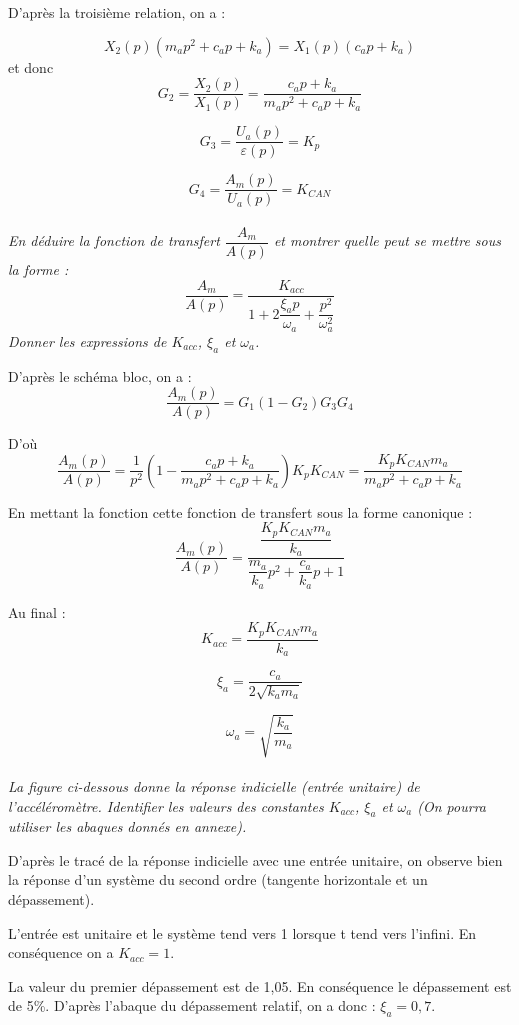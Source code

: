 \documentclass[10pt,oneside]{article}
\begin{document}
D'après la troisième relation, on a :

$$
X_2(p)\left( m_a p^2 +c_a p + k_a \right) = X_1(p) \left( c_a p + k_a  \right)
$$
 et donc 
$$
G_2 = \dfrac{X_2(p)}{X_1(p)} = \dfrac{c_a p + k_a}{m_a p^2 +c_a p + k_a}
$$

$$
G_3 = \dfrac{U_a(p)}{\varepsilon(p)} = K_p
$$

$$
G_4 = \dfrac{A_m(p)}{U_a(p)} = K_{CAN}
$$

\paragraph{}
\textit{En déduire la fonction de transfert $\dfrac{A_m}{A(p)}$ et montrer
quelle peut se mettre sous la forme :}
$$
\dfrac{A_m}{A(p)} = \dfrac{K_{acc}}{1+2\dfrac{\xi_a p}{\omega_a} +
\dfrac{p^2}{\omega_a^2}} 
$$
\textit{Donner les expressions de $K_{acc}$, $\xi_a$ et $\omega_a$.}

D'après le schéma bloc, on a : 
$$
 \dfrac{A_m(p)}{A(p)} = G_1 \left(1 - G_2 \right) G_3 G_4 
$$

D'où 
$$
 \dfrac{A_m(p)}{A(p)} = \dfrac{1}{p^2} \left( 1- \dfrac{c_a p + k_a}{m_a p^2
+c_a p + k_a} \right)  K_p K_{CAN} =
\dfrac{K_p K_{CAN} m_a}{m_a p^2 +c_a p + k_a}
$$

En mettant la fonction cette fonction de transfert sous la forme canonique :
$$
\dfrac{A_m(p)}{A(p)} = \dfrac{\dfrac{K_p K_{CAN} m_a}{k_a}}{\dfrac{m_a}{k_a}p^2
+ \dfrac{c_a}{k_a}p+1}
$$

Au final : 
$$
K_{acc} = \dfrac{K_p K_{CAN} m_a}{k_a}
$$

$$
\xi_a = \dfrac{c_a}{2\sqrt{k_a m_a}}
$$

$$
\omega_a = \sqrt{\dfrac{k_a}{m_a}}
$$
\paragraph{}
\textit{La figure ci-dessous donne la réponse indicielle (entrée unitaire) de
l'accéléromètre. 
Identifier les valeurs des constantes $K_{acc}$, $\xi_a$ et $\omega_a$ (On
pourra utiliser les abaques donnés en annexe).} 

D'après le tracé de la réponse indicielle avec une entrée unitaire, on observe
bien la réponse d'un système du second ordre (tangente horizontale et un
dépassement).

L'entrée est unitaire et le système tend vers 1 lorsque t tend vers l'infini.
En conséquence on a $K_{acc}=1$.

La valeur du premier dépassement est de 1,05. En conséquence le dépassement est
de 5\%. D'après l'abaque du dépassement relatif, on a donc : $\xi_a=0,7$. 
\end{document}
